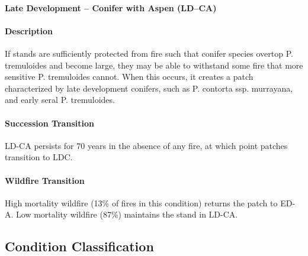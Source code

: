 \noindent\hrulefill


\paragraph{Late Development – Conifer with Aspen (LD–CA)}

\paragraph{Description} If stands are sufficiently protected from fire such that conifer species overtop P. tremuloides and become large, they may be able to withstand some fire that more sensitive P. tremuloides cannot. When this occurs, it creates a patch characterized by late development conifers, such as P. contorta ssp. murrayana, and early seral P. tremuloides. 

\paragraph{Succession Transition} LD-CA persists for 70 years in the absence of any fire, at which point patches transition to LDC. 

\paragraph{Wildfire Transition} High mortality wildfire (13\% of fires in this condition) returns the patch to ED-A. Low mortality wildfire (87\%) maintains the stand in LD-CA. 

\noindent\hrulefill

\subsection*{Condition Classification}


